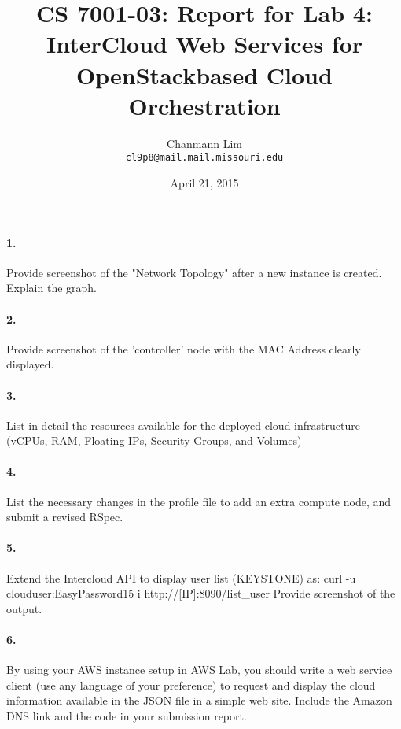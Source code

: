 \documentclass[a4paper]{article}
\begin{document}
\title{CS 7001-03: Report for Lab 4: InterCloud Web Services for OpenStack\-based Cloud Orchestration}
\author{Chanmann Lim\\ 
	\texttt{cl9p8@mail.mail.missouri.edu}}
\date{April 21, 2015}
\maketitle

\paragraph{1. } Provide screenshot of the "Network Topology" after a new instance is created. Explain the graph. 

\paragraph{2. } Provide screenshot of the 'controller' node with the MAC Address clearly displayed.


\paragraph{3. } List in detail the resources available for the deployed cloud infrastructure (vCPUs, RAM, Floating IPs, Security Groups, and Volumes)

\paragraph{4. } List the necessary changes in the profile file to add an extra compute node, and submit a revised RSpec.

\paragraph{5. } Extend the Intercloud API to display user list (KEYSTONE) as:
curl -u clouduser:EasyPassword15 \-i http://[IP]:8090/list\_user Provide screenshot of the output.

\paragraph{6. } By using your AWS instance setup in AWS Lab, you should write a web service client (use any language of your preference) to request and display the cloud information available in the JSON file in a simple web site. Include the Amazon DNS link and the code in your submission report.
\end{document}
